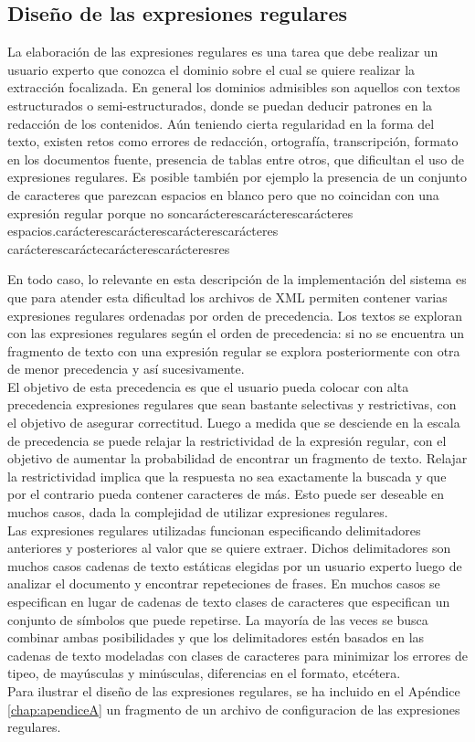 \subsection{Diseño de las expresiones regulares}\label{sect:implementacion-regexp}

La elaboración de las expresiones regulares es una tarea que debe realizar un usuario experto que conozca el dominio sobre el cual se quiere realizar la extracción focalizada. En general los dominios admisibles son aquellos con textos estructurados o semi-estructurados, donde se puedan deducir patrones en la redacción de los contenidos. Aún teniendo cierta regularidad en la forma del texto, existen retos como errores de redacción, ortografía, transcripción, formato en los documentos fuente, presencia de tablas entre otros, que dificultan el uso de expresiones regulares. Es posible también por ejemplo la presencia de un conjunto de caracteres que parezcan espacios en blanco pero que no coincidan con una expresión regular porque no soncarácterescarácterescarácteres espacios.carácterescarácterescarácterescarácteres \\carácterescaráctecarácterescarácteresres

En todo caso, lo relevante en esta descripción de la implementación del sistema es que para atender esta dificultad los archivos de XML permiten contener varias expresiones regulares ordenadas por orden de precedencia. Los textos se exploran con las expresiones regulares según el orden de precedencia: si no se encuentra un fragmento de texto con una expresión regular se explora posteriormente con otra de menor precedencia y así sucesivamente. \\

El objetivo de esta precedencia es que el usuario pueda colocar con alta precedencia expresiones regulares que sean bastante selectivas y restrictivas, con el objetivo de asegurar correctitud. Luego a medida que se desciende en la escala de precedencia se puede relajar la restrictividad de la expresión regular, con el objetivo de aumentar la probabilidad de encontrar un fragmento de texto. Relajar la restrictividad implica que la respuesta no sea exactamente la buscada y que por el contrario pueda contener caracteres de más. Esto puede ser deseable en muchos casos, dada la complejidad de utilizar expresiones regulares.  \\

Las expresiones regulares utilizadas funcionan especificando delimitadores anteriores y posteriores al valor que se quiere extraer. Dichos delimitadores son muchos casos cadenas de texto estáticas elegidas por un usuario experto luego de analizar el documento y encontrar repeteciones de frases. En muchos casos se especifican en lugar de cadenas de texto clases de caracteres que especifican un conjunto de símbolos que puede repetirse. La mayoría de las veces se busca combinar ambas posibilidades y que los delimitadores estén basados en las cadenas de texto modeladas con clases de caracteres para minimizar los errores de tipeo, de mayúsculas y minúsculas, diferencias en el formato, etcétera.\\

Para ilustrar el diseño de las expresiones regulares, se ha incluido en el Apéndice \ref{chap:apendiceA} un fragmento de un archivo de configuracion de las expresiones regulares. \\
